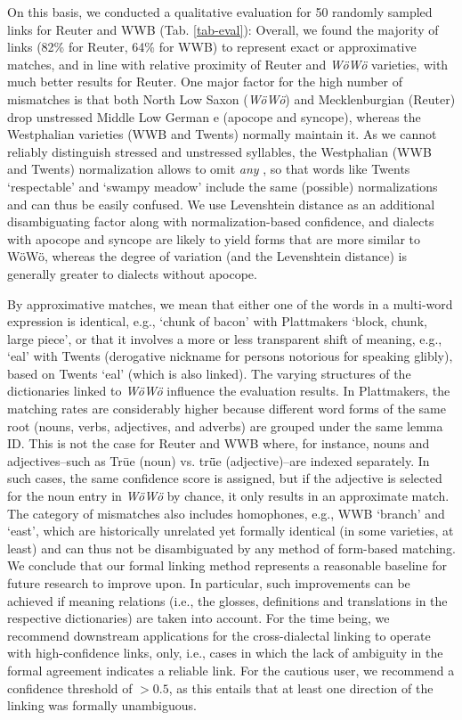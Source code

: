 On this basis, we conducted a qualitative evaluation for 50 randomly sampled links for Reuter and WWB (Tab. \ref{tab-eval}): 
Overall, we found the majority of links (82\% for Reuter, 64\% for WWB) to represent exact or approximative matches, and in line with relative proximity of Reuter and \emph{WöWö} varieties, with much better results for Reuter. One major factor for the high number of mismatches is that both North Low Saxon (\emph{WöWö}) and Mecklenburgian (Reuter) drop unstressed Middle Low German e (apocope and syncope), whereas the Westphalian varieties (WWB and Twents) normally maintain it.
As we cannot reliably distinguish stressed and unstressed syllables, the Westphalian (WWB and Twents) normalization allows to omit \emph{any} , so that words like Twents  `respectable' and  `swampy meadow' include the same (possible) normalizations and can thus be easily confused. We use Levenshtein distance as an additional disambiguating factor along with normalization-based confidence, and dialects with apocope and syncope are likely to yield forms that are more similar to WöWö, whereas the degree of variation (and the Levenshtein distance) is generally greater to dialects without apocope.

By approximative matches, we mean that either one of the words in a multi-word expression is identical, e.g.,  `chunk of bacon' with Plattmakers  `block, chunk, large piece', or that it involves a more or less transparent shift of meaning, e.g.,  `eal' with Twents  (derogative nickname for persons notorious for speaking glibly), based on Twents  `eal' (which is also linked). 
The varying structures of the dictionaries linked to \emph{WöWö} influence the evaluation results. In %
Plattmakers, %
the matching rates are considerably higher because different word forms of the same root (nouns, verbs, adjectives, and adverbs) are grouped under the same lemma ID. This is not the case for Reuter and WWB where, for instance, nouns and adjectives--such as Trūe (noun) vs. trǖe (adjective)--are indexed separately. In such cases, the same confidence score is assigned, but if the adjective is selected for the noun entry  in \emph{WöWö} by chance, it only results in an approximate match. The category of mismatches also includes homophones, e.g., WWB  `branch' and  `east', which are historically unrelated yet formally identical (in some varieties, at least) and can thus not be disambiguated by any method of form-based matching.
We conclude that our formal linking method represents a reasonable baseline for future research to improve upon.
In particular, such improvements can be achieved if meaning relations (i.e., the glosses, definitions and translations in the respective dictionaries) are taken into account. 
For the time being, we recommend downstream applications for the cross-dialectal linking to operate with high-confidence links, only, i.e., cases in which the lack of ambiguity in the formal agreement indicates a reliable link. For the cautious user, we recommend a confidence threshold of $>0.5$, as this entails that at least one direction of the linking was formally unambiguous. 

